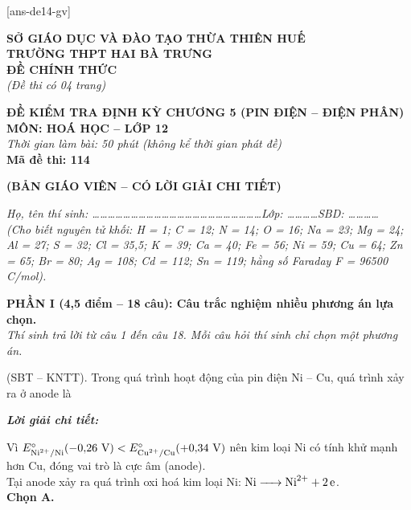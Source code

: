 \documentclass[11pt,a4paper]{article}
\def\loigiai#1{
\par\begingroup\color{blue!80!black}\small
\noindent\textbf{\textit{Lời giải chi tiết:}}\par
#1\par\endgroup}
\begin{document}
[ans-de14-gv]

\noindent
\begin{minipage}[t]{0.48\textwidth}
	\textbf{SỞ GIÁO DỤC VÀ ĐÀO TẠO THỪA THIÊN HUẾ}\\
	\textbf{TRƯỜNG THPT HAI BÀ TRƯNG}\\
	\textbf{ĐỀ CHÍNH THỨC}\\
	\textit{(Đề thi có 04 trang)}
\end{minipage}\hfill
\begin{minipage}[t]{0.48\textwidth}
	\raggedleft
	\textbf{\color{mainGreen}ĐỀ KIỂM TRA ĐỊNH KỲ CHƯƠNG 5 (PIN ĐIỆN – ĐIỆN PHÂN)}\\
	\textbf{MÔN: HOÁ HỌC -- LỚP 12}\\
	\textit{Thời gian làm bài: 50 phút (không kể thời gian phát đề)}\\
	\textbf{Mã đề thi: 114}
\end{minipage}


\vspace{0.1cm}
\begin{center}
	\textbf{\color{hfRed}\Large (BẢN GIÁO VIÊN -- CÓ LỜI GIẢI CHI TIẾT)}
\end{center}

\vspace{1pt}
\noindent\textit{Họ, tên thí sinh: \dots\dots\dots\dots\dots\dots\dots\dots\dots\dots\dots\dots\dots\dots\dots\dots\dots\dots\dots\dots\dots\dots Lớp: \dots\dots\dots\dots SBD: \dots\dots\dots\dots}\\
\noindent\textit{(Cho biết nguyên tử khối: H = 1; C = 12; N = 14; O = 16; Na = 23; Mg = 24; Al = 27; S = 32; Cl = 35,5; K = 39; Ca = 40; Fe = 56; Ni = 59; Cu = 64; Zn = 65; Br = 80; Ag = 108; Cd = 112; Sn = 119; hằng số Faraday F = 96500 C/mol).}

\vspace{2pt}
\noindent
\textbf{PHẦN I (4,5 điểm -- 18 câu): Câu trắc nghiệm nhiều phương án lựa chọn.}\\
\textit{Thí sinh trả lời từ câu 1 đến câu 18. Mỗi câu hỏi thí sinh chỉ chọn một phương án.}

\setcounter{ex}{0}

\begin{ex}
(SBT – KNTT). Trong quá trình hoạt động của pin điện Ni -- Cu, quá trình xảy ra ở anode là
\choice
{\True {}}
{}
{}
{}
\loigiai{
Vì $E^\circ_{\ce{Ni^2+/Ni}} (-0{,}26\text{ V}) < E^\circ_{\ce{Cu^2+/Cu}} (+0{,}34\text{ V})$ nên kim loại Ni có tính khử mạnh hơn Cu, đóng vai trò là cực âm (anode).\\
Tại anode xảy ra quá trình oxi hoá kim loại Ni: $\ce{Ni -> Ni^2+ + 2e}$.\\
\textbf{Chọn A.}}
\end{ex}
\end{document}
